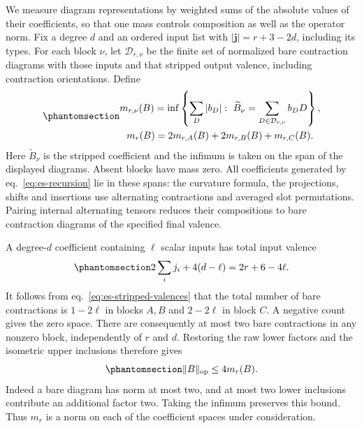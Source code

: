 \documentclass[
  english,
  11pt,
  reqno]{amsart}
\begin{document}
We measure diagram representations by weighted sums of the absolute
values of their coefficients, so that one mass controls composition as
well as the operator norm. Fix a degree \(d\) and an ordered input list
with \(|\mathbf j|=r+3-2d\), including its types. For each block
\(\nu\), let \(\mathcal D_{r,\nu}\) be the finite set of normalized bare
contraction diagrams with those inputs and that stripped output valence,
including contraction orientations. Define
\begin{equation}\protect\phantomsection\label{eq:es-diagram-mass}{\begin{gathered}
m_{r,\nu}(B)=\inf\left\{
       \sum_D|b_D|:\ 
       \widetilde B_\nu=\sum_{D\in\mathcal D_{r,\nu}}b_DD
                     \right\}, \\
m_r(B)=2m_{r,A}(B)+2m_{r,B}(B)+m_{r,C}(B).
\end{gathered}}\end{equation} Here \(\widetilde B_\nu\) is the stripped coefficient
and the infimum is taken on the span of the displayed diagrams. Absent
blocks have mass zero. All coefficients generated by
eq.~\ref{eq:es-recursion} lie in these spans: the curvature formula, the
projections, shifts and insertions use alternating contractions and
averaged slot permutations. Pairing internal alternating tensors reduces
their compositions to bare contraction diagrams of the specified final
valence.

A degree-\(d\) coefficient containing \(\ell\) scalar inputs has total
input valence
\begin{equation}\protect\phantomsection\label{eq:es-input-valence}{
 2\sum_i j_i+4(d-\ell)=2r+6-4\ell.
}\end{equation} It follows from eq.~\ref{eq:es-stripped-valences} that
the total number of bare contractions is \(1-2\ell\) in blocks \(A,B\)
and \(2-2\ell\) in block \(C\). A negative count gives the zero space.
There are consequently at most two bare contractions in any nonzero
block, independently of \(r\) and \(d\). Restoring the raw lower factors
and the isometric upper inclusions therefore gives
\begin{equation}\protect\phantomsection\label{eq:es-mass-dominates-norm}{
 \|B\|_{\mathrm{op}}\le4m_r(B).
}\end{equation} Indeed a bare diagram has norm at most two, and at most
two lower inclusions contribute an additional factor two. Taking the
infimum preserves this bound. Thus \(m_r\) is a norm on each of the
coefficient spaces under consideration.
\end{document}
